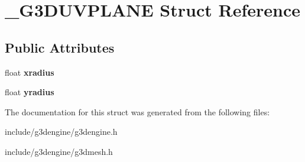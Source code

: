 \hypertarget{struct__G3DUVPLANE}{}\section{\+\_\+\+G3\+D\+U\+V\+P\+L\+A\+NE Struct Reference}
\label{struct__G3DUVPLANE}
\subsection*{Public Attributes}
\begin{DoxyCompactItemize}
\item 
\mbox{\label{struct__G3DUVPLANE_a0b93b8f2aa798080880ec860c2507b45}} 
float {\bfseries xradius}
\item 
\mbox{\label{struct__G3DUVPLANE_a37130098d237b9e1782eb38439fcbbdc}} 
float {\bfseries yradius}
\end{DoxyCompactItemize}


The documentation for this struct was generated from the following files\+:\begin{DoxyCompactItemize}
\item 
include/g3dengine/g3dengine.\+h\item 
include/g3dengine/g3dmesh.\+h\end{DoxyCompactItemize}
